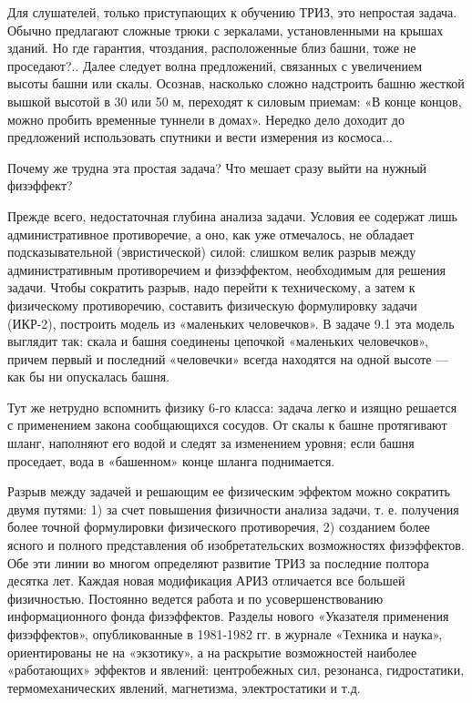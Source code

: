 Для  слушателей, только  приступающих к  обучению ТРИЗ,  это непростая
задача. Обычно предлагают сложные трюки с зеркалами, установленными на
крышах зданий.  Но где гарантия, чтоздания,  расположенные близ башни,
тоже  не  проседают?..  Далее  следует  волна  предложений,  связанных
с  увеличением  высоты  башни  или скалы.  Осознав,  насколько  сложно
надстроить башню  жесткой вышкой высотой  в 30  или 50 м,  переходят к
силовым приемам:  «В конце концов,  можно пробить временные  туннели в
домах». Нередко  дело доходит  до предложений использовать  спутники и
вести измерения из космоса...

Почему же трудна эта простая задача?  Что мешает сразу выйти на нужный
физэффект?

Прежде  всего,  недостаточная  глубина   анализа  задачи.  Условия  ее
содержат   лишь  административное   противоречие,  а   оно,  как   уже
отмечалось,  не  обладает   подсказывательной  (эвристической)  силой:
слишком   велик   разрыв   между  административным   противоречием   и
физэффектом, необходимым  для решения задачи. Чтобы  сократить разрыв,
надо  перейти  к техническому,  а  затем  к физическому  противоречию,
составить физическую формулировку задачи  (ИКР-2), построить модель из
«маленьких человечков». В задаче 9.1  эта модель выглядит так: скала и
башня  соединены  цепочкой  «маленьких человечков»,  причем  первый  и
последний «человечки»  всегда находятся  на одной высоте  — как  бы ни
опускалась башня.

Тут же  нетрудно вспомнить физику  6-го класса: задача легко  и изящно
решается с применением  закона сообщающихся сосудов. От  скалы к башне
протягивают шланг, наполняют его водой  и следят за изменением уровня;
если башня проседает, вода в «башенном» конце шланга поднимается.

Разрыв между задачей и решающим ее физическим эффектом можно сократить
двумя путями:  1) за счет  повышения физичности анализа задачи,  т. е.
получения  более  точной  формулировки  физического  противоречия,  2)
созданием  более ясного  и полного  представления об  изобретательских
возможностях физэффектов. Обе эти  линии во многом определяют развитие
ТРИЗ за последние  полтора десятка лет. Каждая  новая модификация АРИЗ
отличается  все большей  физичностью.  Постоянно ведется  работа и  по
усовершенствованию информационного  фонда физэффектов.  Разделы нового
«Указателя применения  физэффектов», опубликованные в 1981-1982  гг. в
журнале  «Техника  и наука»,  ориентированы  не  на «экзотику»,  а  на
раскрытие  возможностей  наиболее  «работающих»  эффектов  и  явлений:
центробежных сил, резонанса,  гидростатики, термомеханических явлений,
магнетизма, электростатики и т.д.



